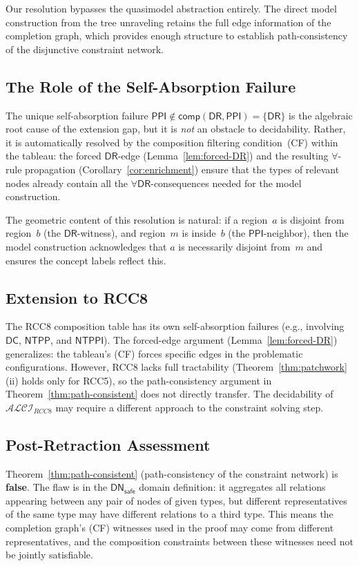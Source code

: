 \documentclass[a4paper,11pt]{article}
\theoremstyle{definition}
\newcommand{\ALCIRCC}[1]{\ensuremath{\mathcal{ALCI}_{\mathit{RCC#1}}}}
\newcommand{\DR}{\ensuremath{\mathsf{DR}}}
\newcommand{\PPI}{\ensuremath{\mathsf{PPI}}}
\newcommand{\comp}{\ensuremath{\mathsf{comp}}}
\newcommand{\DN}{\ensuremath{\mathsf{DN}}}
\begin{document}
Our resolution bypasses the quasimodel abstraction entirely.  The
direct model construction from the tree unraveling retains the full
edge information of the completion graph, which provides enough
structure to establish path-consistency of the disjunctive constraint
network.

\subsection{The Role of the Self-Absorption Failure}

The unique self-absorption failure $\PPI \notin \comp(\DR, \PPI) =
\{\DR\}$ is the algebraic root cause of the extension gap, but it is
\emph{not} an obstacle to decidability.  Rather, it is automatically
resolved by the composition filtering condition~(CF) within the
tableau: the forced $\DR$-edge (Lemma~\ref{lem:forced-DR}) and the
resulting $\forall$-rule propagation (Corollary~\ref{cor:enrichment})
ensure that the types of relevant nodes already contain all the
$\forall\DR$-consequences needed for the model construction.

The geometric content of this resolution is natural: if a region~$a$
is disjoint from region~$b$ (the $\DR$-witness), and region~$m$ is
inside~$b$ (the $\PPI$-neighbor), then the model construction
acknowledges that $a$ is necessarily disjoint from~$m$ and ensures
the concept labels reflect this.

\subsection{Extension to RCC8}

The RCC8 composition table has its own self-absorption failures (e.g.,
involving $\mathsf{DC}$, $\mathsf{NTPP}$, and $\mathsf{NTPPI}$).
The forced-edge argument (Lemma~\ref{lem:forced-DR}) generalizes: the
tableau's (CF) forces specific edges in the problematic
configurations.  However, RCC8 lacks full tractability
(Theorem~\ref{thm:patchwork}(ii) holds only for RCC5), so the
path-consistency argument in Theorem~\ref{thm:path-consistent} does
not directly transfer.  The decidability of $\ALCIRCC{8}$ may require
a different approach to the constraint solving step.

\subsection{Post-Retraction Assessment}

Theorem~\ref{thm:path-consistent} (path-consistency of the constraint
network) is \textbf{false}.  The flaw is in the $\DN_{\mathsf{safe}}$
domain definition: it aggregates all relations appearing between any
pair of nodes of given types, but different representatives of the same
type may have different relations to a third type.  This means the
completion graph's (CF) witnesses used in the proof may come from
different representatives, and the composition constraints between
these witnesses need not be jointly satisfiable.
\end{document}
